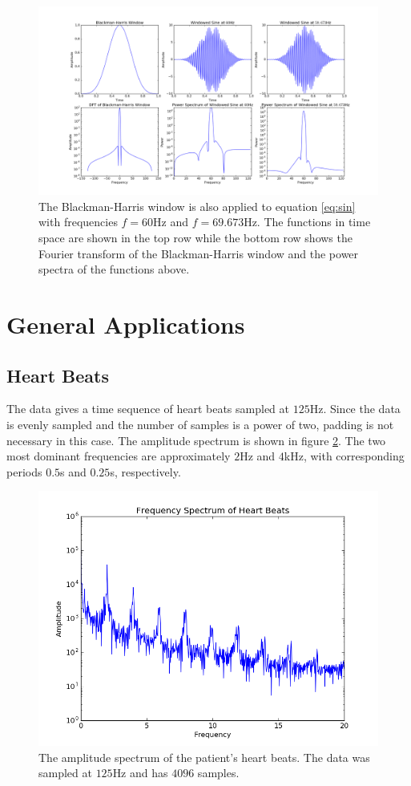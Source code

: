 \documentclass[11pt, letterpage, twocolumn]{article}
\begin{document}
\begin{figure}
  \includegraphics[width=\linewidth]{blackman_harris.png}
  \caption{
    The Blackman-Harris window is also applied to equation \ref{eq:sin} with
    frequencies $f = 60$Hz and $f = 69.673$Hz. The functions in time space are
    shown in the top row while the bottom row shows the Fourier transform of the
    Blackman-Harris window and the power spectra of the functions above.
  }
  \label{fig:blackman_harris}
\end{figure}

\section{General Applications}

\subsection{Heart Beats}
The data gives a time sequence of heart beats sampled at $125$Hz. Since the data
is evenly sampled and the number of samples is a power of two, padding is not
necessary in this case. The amplitude spectrum is shown in figure
\ref{fig:beats}. The two most dominant frequencies are approximately $2$Hz and
$4$kHz, with corresponding periods $0.5$s and $0.25$s, respectively.

\begin{figure}
  \includegraphics[width=\linewidth]{beats.png}
  \caption{
    The amplitude spectrum of the patient's heart beats. The data was sampled at
    $125$Hz and has $4096$ samples.
  }
  \label{fig:beats}
\end{figure}
\end{document}
